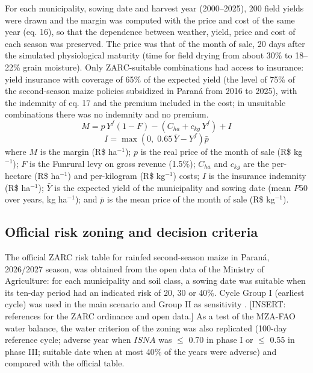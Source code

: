\documentclass[10pt,a4paper]{article}
\begin{document}
For each municipality, sowing date and harvest year (2000--2025), 200 field yields were drawn and the
margin was computed with the price and cost of the same year (eq. 16), so that the dependence between
weather, yield, price and cost of each season was preserved. The price was that of the month of sale,
20 days after the simulated physiological maturity (time for field drying from about 30\% to 18--22\%
grain moisture). Only ZARC-suitable combinations had access to insurance: yield insurance with coverage of
65\% of the expected yield (the level of 75\% of the second-season maize policies subsidized in Paraná
from 2016 to 2025), with the indemnity of eq. 17 and the premium included in the cost; in unsuitable
combinations there was no indemnity and no premium.
\begin{equation}
M = p\,Y^{f}(1 - F) - \left(C_{ha} + c_{kg}\,Y^{f}\right) + I
\label{eq:margin}
\end{equation}
\begin{equation}
I = \max\!\left(0,\; 0.65\,\bar{Y} - Y^{f}\right)\bar{p}
\label{eq:indemnity}
\end{equation}
where $M$ is the margin (R\$ ha$^{-1}$); $p$ is the real price of the month of sale (R\$ kg$^{-1}$); $F$ is
the Funrural levy on gross revenue (1.5\%); $C_{ha}$ and $c_{kg}$ are the per-hectare (R\$ ha$^{-1}$) and
per-kilogram (R\$ kg$^{-1}$) costs; $I$ is the insurance indemnity (R\$ ha$^{-1}$); $\bar{Y}$ is the expected
yield of the municipality and sowing date (mean $P50$ over years, kg ha$^{-1}$); and $\bar{p}$ is the mean
price of the month of sale (R\$ kg$^{-1}$).

\subsection{Official risk zoning and decision criteria}
\label{subsec:decision}

The official ZARC risk table for rainfed second-season maize in Paraná, 2026/2027 season, was obtained
from the open data of the Ministry of Agriculture: for each municipality and soil class, a sowing date was
suitable when its ten-day period had an indicated risk of 20, 30 or 40\%. Cycle Group I (earliest cycle)
was used in the main scenario and Group II as sensitivity \citep{monteiro2021, embrapa2023}.
[INSERT: references for the ZARC ordinance and open data.] As a test of the MZA-FAO water balance, the
water criterion of the zoning was also replicated (100-day reference cycle; adverse year when $ISNA$ was
$\le$ 0.70 in phase I or $\le$ 0.55 in phase III; suitable date when at most 40\% of the years were
adverse) and compared with the official table.
\end{document}
